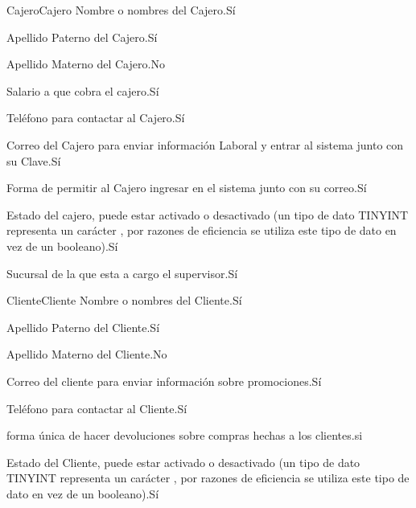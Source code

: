 \begin{cdtEntidad}{Cajero}{Cajero}
		{Nombre o nombres del Cajero.}{Sí}
		
		{Apellido Paterno del Cajero.}{Sí}
		
		{Apellido Materno del Cajero.}{No}
		
		{Salario a que cobra el cajero.}{Sí}
		
		{Teléfono para contactar al Cajero.}{Sí}
		
		{Correo del Cajero para enviar información Laboral y entrar al sistema junto con su Clave.}{Sí}
		
		{Forma de permitir al Cajero ingresar en el sistema junto con su correo.}{Sí}
	
		{Estado del cajero, puede estar activado o desactivado (un tipo de dato TINYINT representa un carácter , por razones de eficiencia se utiliza este tipo de dato en vez de un booleano).}{Sí}	
	
		{Sucursal de la que esta a cargo el supervisor.}{Sí}

		\cdtEntityRelSection
\end{cdtEntidad}

\begin{cdtEntidad}{Cliente}{Cliente}
		{Nombre o nombres del Cliente.}{Sí}
		
		{Apellido Paterno del Cliente.}{Sí}
		
		{Apellido Materno del Cliente.}{No}
		
		{Correo del cliente para enviar información sobre promociones.}{Sí}
		
		{Teléfono para contactar al Cliente.}{Sí}
		
		{forma única de hacer devoluciones sobre compras hechas a los clientes.}{si}

		{Estado del Cliente, puede estar activado o desactivado (un tipo de dato TINYINT representa un carácter , por razones de eficiencia se utiliza este tipo de dato en vez de un booleano).}{Sí}	
		
		\cdtEntityRelSection
\end{cdtEntidad}


